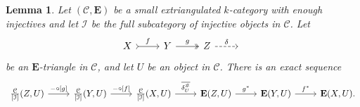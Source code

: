 \documentclass[10pt,twoside, a4paper,reqno]{amsart}
\newcommand{\calI}{\mathcal{I}}
\newcommand{\calC}{\mathcal{C}}
\newcommand{\E}{\mathbf{E}}
\newtheorem{lemma}[theorem]{Lemma}
\theoremstyle{definition}
\begin{document}
\begin{lemma}\label{lem:LESmodinj}
	Let $(\calC,\E)$ be a small extriangulated $k$-category with enough injectives and let $\mathcal{I}$ be the full subcategory of injective objects in $\calC$. Let 
   	\[ \begin{tikzcd}
			X \arrow[r,tail, "f"] & Y \arrow[r,two heads, "g"] & Z\arrow[r,dashed, "\delta"] & {}
	\end{tikzcd} 
	\]
	be an $\E$-triangle in $\calC$, and let $U$ be an object in $\calC$. There is an exact sequence
	 \begin{equation*}
    \begin{tikzcd}
        \frac{\calC}{[\calI]}(Z,U) \arrow[r, "- \circ {[g]}"] & \frac{\calC}{[\calI]}(Y,U) \arrow[r, "- \circ {[f]}"] &\frac{\calC}{[\calI]}(X,U) \arrow[r, "\overline{\delta_U^{\#}}"] & \E(Z,U) \arrow[r, "g^*"] & \E(Y,U) \arrow[r, "f^*"] & \E(X,U).
        \end{tikzcd}
    \end{equation*}
\end{lemma}
\end{document}
